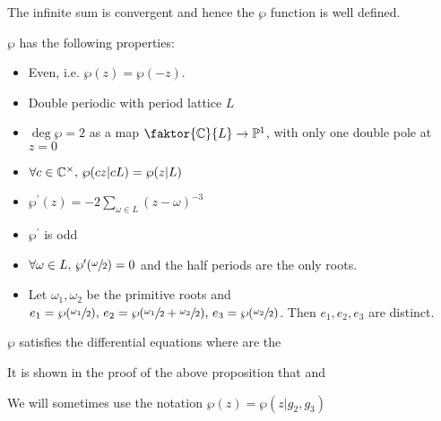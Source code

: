\documentclass{article}
\begin{document}
\begin{prop}
	The infinite sum is convergent and hence the $\wp$ function is well defined.
\end{prop}

\begin{prop}
	$\wp$ has the following properties:
	\begin{itemize}
		\item Even, i.e. $\wp(z) = \wp(-z)$.
		\item Double periodic with period lattice $L$
		\item $\deg \wp = 2$ as a map $\faktor{\mbb{C}}{L} \to \mbb{P}^1$, with only one double pole at $z=0$
		\item $\forall c \in \mathbb{C}^\times, \, \wp(cz | cL) = \wp(z | L)$
		\item $\wp^\prime(z) = -2\sum_{\omega \in L} (z-\omega)^{-3}$
		\item $\wp^\prime$ is odd
		\item $\forall \omega \in L, \, \wp^\prime(\sfrac{\omega}{2}) =0$ and the half periods are the only roots. 
		\item Let $\omega_1, \omega_2$ be the primitive roots and $e_1 = \wp(\sfrac{\omega_1}{2}), \, e_2 = \wp(\sfrac{\omega_1}{2} + \sfrac{\omega_2}{2}), \, e_3 = \wp(\sfrac{\omega_2}{2})$. Then $e_1, e_2, e_3$ are distinct.
	\end{itemize}
\end{prop}

\begin{prop}
	$\wp$ satisfies the differential equations 
where 
are the 
\end{prop}

\begin{remark}
	It is shown in the proof of the above proposition that 
and 
\end{remark}

\begin{remark}
We will sometimes use the notation $\wp(z) = \wp(z | g_2, g_3)$
\end{remark}
\end{document}
